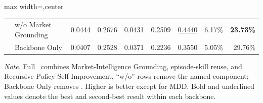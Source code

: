 \begin{table}[t]
\begin{adjustbox}{max width=\textwidth,center}
\begin{tabular}{@{}llrrrrrrr@{}}
      & w/o Market Grounding & 0.0444 & 0.2676 & 0.0431 & 0.2509 & \underline{0.4440} & 6.17\% & \textbf{23.73\%} \\
      & Backbone Only & 0.0407 & 0.2528 & 0.0371 & 0.2236 & 0.3550 & 5.05\% & 29.76\% \\
    \bottomrule
  \end{tabular}%
  \end{adjustbox}
  \par\vspace{2pt}
  \parbox{0.98\textwidth}{\footnotesize\textit{Note.} Full \MethodName\ combines Market-Intelligence Grounding, episode-skill reuse, and Recursive Policy Self-Improvement. ``w/o'' rows remove the named component; Backbone Only removes \MethodName. Higher is better except for MDD. Bold and underlined values denote the best and second-best result within each backbone.}
\end{table}
